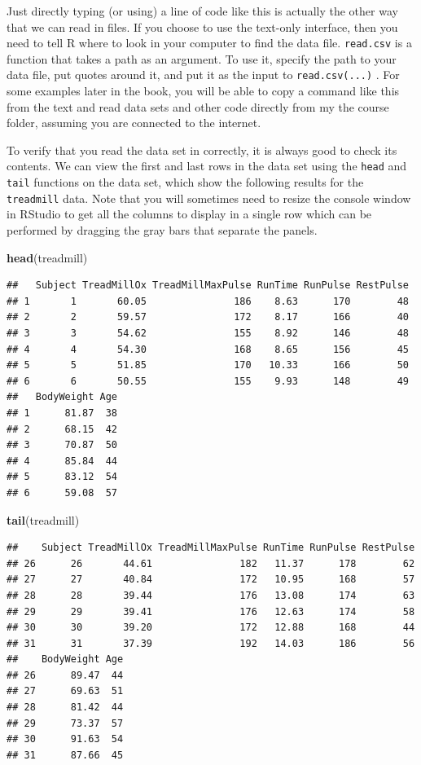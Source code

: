 \documentclass[]{book}
\newenvironment{Shaded}{\begin{snugshade}}{\end{snugshade}}
\newcommand{\KeywordTok}[1]{\textcolor[rgb]{0.13,0.29,0.53}{\textbf{{#1}}}}
\newcommand{\NormalTok}[1]{{#1}}
\begin{document}
Just directly typing (or using) a line of code like this is actually the
other way that we can read in files. If you choose to use the text-only
interface, then you need to tell R where to look in your computer to
find the data file. \texttt{read.csv} is a function that takes a path as
an argument. To use it, specify the path to your data file, put quotes
around it, and put it as the input to \texttt{read.csv(...)} . For some
examples later in the book, you will be able to copy a command like this
from the text and read data sets and other code directly from my the
course folder, assuming you are connected to the internet.

To verify that you read the data set in correctly, it is always good to
check its contents. We can view the first and last rows in the data set
using the \texttt{head} and \texttt{tail} functions on the data set,
which show the following results for the \texttt{treadmill} data. Note
that you will sometimes need to resize the console window in RStudio to
get all the columns to display in a single row which can be performed by
dragging the gray bars that separate the panels.

\begin{Shaded}
\begin{Highlighting}[]
\KeywordTok{head}\NormalTok{(treadmill)}
\end{Highlighting}
\end{Shaded}

\begin{verbatim}
##   Subject TreadMillOx TreadMillMaxPulse RunTime RunPulse RestPulse
## 1       1       60.05               186    8.63      170        48
## 2       2       59.57               172    8.17      166        40
## 3       3       54.62               155    8.92      146        48
## 4       4       54.30               168    8.65      156        45
## 5       5       51.85               170   10.33      166        50
## 6       6       50.55               155    9.93      148        49
##   BodyWeight Age
## 1      81.87  38
## 2      68.15  42
## 3      70.87  50
## 4      85.84  44
## 5      83.12  54
## 6      59.08  57
\end{verbatim}

\begin{Shaded}
\begin{Highlighting}[]
\KeywordTok{tail}\NormalTok{(treadmill)}
\end{Highlighting}
\end{Shaded}

\begin{verbatim}
##    Subject TreadMillOx TreadMillMaxPulse RunTime RunPulse RestPulse
## 26      26       44.61               182   11.37      178        62
## 27      27       40.84               172   10.95      168        57
## 28      28       39.44               176   13.08      174        63
## 29      29       39.41               176   12.63      174        58
## 30      30       39.20               172   12.88      168        44
## 31      31       37.39               192   14.03      186        56
##    BodyWeight Age
## 26      89.47  44
## 27      69.63  51
## 28      81.42  44
## 29      73.37  57
## 30      91.63  54
## 31      87.66  45
\end{verbatim}
\end{document}
